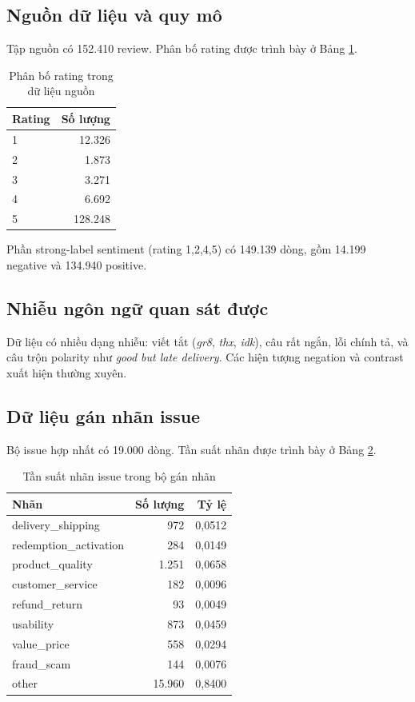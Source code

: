 ﻿\documentclass[12pt,a4paper]{article}
\begin{document}
\subsection{Nguồn dữ liệu và quy mô}
Tập nguồn có 152.410 review. Phân bố rating được trình bày ở Bảng \ref{tab:rating_distribution_vi}.

\begin{table}[H]
\centering
\caption{Phân bố rating trong dữ liệu nguồn}
\label{tab:rating_distribution_vi}
\begin{tabular}{lr}
\toprule
Rating & Số lượng \\
\midrule
1 & 12.326 \\
2 & 1.873 \\
3 & 3.271 \\
4 & 6.692 \\
5 & 128.248 \\
\bottomrule
\end{tabular}
\end{table}

Phần strong-label sentiment (rating 1,2,4,5) có 149.139 dòng, gồm 14.199 negative và 134.940 positive.

\subsection{Nhiễu ngôn ngữ quan sát được}
Dữ liệu có nhiều dạng nhiễu: viết tắt (\textit{gr8}, \textit{thx}, \textit{idk}), câu rất ngắn, lỗi chính tả, và câu trộn polarity như \textit{good but late delivery}. Các hiện tượng negation và contrast xuất hiện thường xuyên.

\subsection{Dữ liệu gán nhãn issue}
Bộ issue hợp nhất có 19.000 dòng. Tần suất nhãn được trình bày ở Bảng \ref{tab:issue_freq_vi}.

\begin{table}[H]
\centering
\caption{Tần suất nhãn issue trong bộ gán nhãn}
\label{tab:issue_freq_vi}
\begin{tabular}{lrr}
\toprule
Nhãn & Số lượng & Tỷ lệ \\
\midrule
delivery\_shipping & 972 & 0,0512 \\
redemption\_activation & 284 & 0,0149 \\
product\_quality & 1.251 & 0,0658 \\
customer\_service & 182 & 0,0096 \\
refund\_return & 93 & 0,0049 \\
usability & 873 & 0,0459 \\
value\_price & 558 & 0,0294 \\
fraud\_scam & 144 & 0,0076 \\
other & 15.960 & 0,8400 \\
\bottomrule
\end{tabular}
\end{table}
\end{document}
